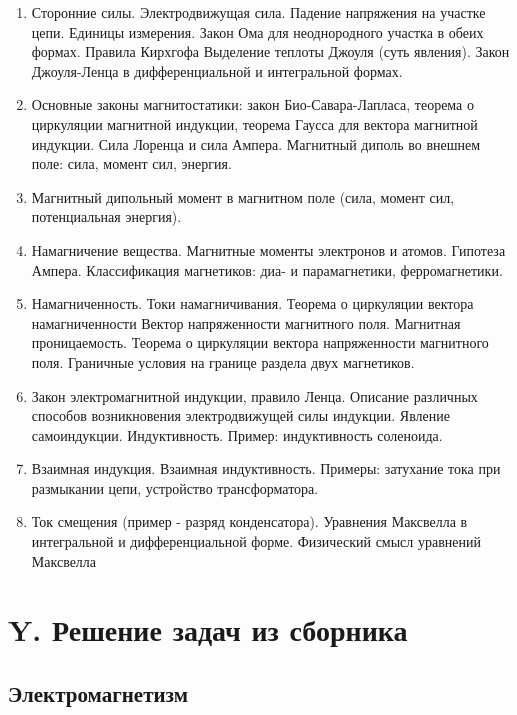 \documentclass[12pt]{article}
\begin{document}
\begin{enumerate}
        \item Сторонние силы. Электродвижущая сила. Падение напряжения на участке цепи. Единицы измерения. Закон Ома для неоднородного участка в обеих формах. Правила Кирхгофа Выделение теплоты Джоуля (суть явления). Закон Джоуля-Ленца в дифференциальной и интегральной формах.
        \item Основные законы магнитостатики: закон Био-Савара-Лапласа, теорема о циркуляции магнитной индукции, теорема Гаусса для вектора магнитной индукции. Сила Лоренца и сила Ампера. Магнитный диполь во внешнем поле: сила, момент сил, энергия.
        \item Магнитный дипольный момент в магнитном поле (сила, момент сил, потенциальная энергия).
        \item Намагничение вещества. Магнитные моменты электронов и атомов. Гипотеза Ампера. Классификация магнетиков: диа- и парамагнетики, ферромагнетики.
        \item Намагниченность. Токи намагничивания. Теорема о циркуляции вектора намагниченности Вектор напряженности магнитного поля. Магнитная проницаемость. Теорема о циркуляции вектора напряженности магнитного поля. Граничные условия на границе раздела двух магнетиков.
        \item Закон электромагнитной индукции, правило Ленца. Описание различных способов возникновения электродвижущей силы индукции. Явление самоиндукции. Индуктивность. Пример: индуктивность соленоида.
        \item Взаимная индукция. Взаимная индуктивность. Примеры: затухание тока при размыкании цепи, устройство трансформатора.
        \item Ток смещения (пример - разряд конденсатора). Уравнения Максвелла в интегральной и дифференциальной форме. Физический смысл уравнений Максвелла
    \end{enumerate}






\clearpage

\section{Y. Решение задач из сборника}

\subsection{Электромагнетизм}
\end{document}
